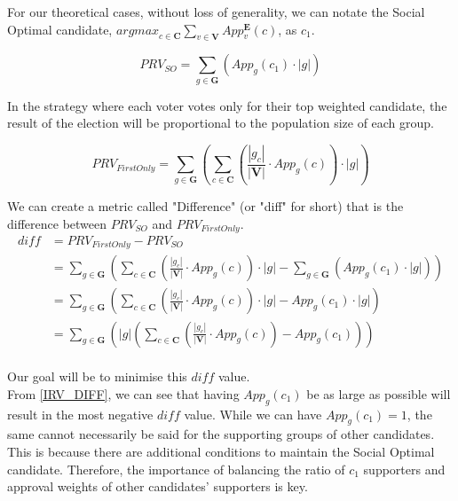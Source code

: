 \documentclass{article}
\begin{document}
For our theoretical cases, without loss of generality, we can notate the Social Optimal candidate, ${argmax}_{c \in \boldsymbol{C}} \sum^{}_{v \in \boldsymbol{V}}{App^{\boldsymbol{E}}_{v}(c)}$, as $c_1$.

\begin{equation}
     PRV_{SO} = \sum^{}_{g \in \boldsymbol{G}}{\left(App_g(c_1)\cdot|g|\right)} 
\end{equation}

In the strategy where each voter votes only for their top weighted candidate, the result of the election will be proportional to the population size of each group.

\begin{equation}
     PRV_{FirstOnly} = \sum^{}_{g \in \boldsymbol{G}}{\left(\sum^{}_{c \in \boldsymbol{C}}{\left(\frac{|g_c|}{|\boldsymbol{V}|} \cdot App_g(c)\right)} \cdot |g|\right)} 
\end{equation} 

We can create a metric called "Difference" (or "diff" for short) that is the difference between $PRV_{SO}$ and $PRV_{FirstOnly}$.
\begin{equation}\label{DIFF_EQN_0}
\begin{aligned}
{diff} &= PRV_{FirstOnly} - PRV_{SO}\\
&= \sum^{}_{g \in \boldsymbol{G}}{\left(\sum^{}_{c \in \boldsymbol{C}}{\left(\frac{|g_c|}{|\boldsymbol{V}|} \cdot App_g(c)\right)} \cdot |g| - \sum^{}_{g \in \boldsymbol{G}}{\left(App_g(c_1)\cdot|g|\right)}\right)}\\
&= \sum^{}_{g \in \boldsymbol{G}}{\left(\sum^{}_{c \in \boldsymbol{C}}{\left(\frac{|g_c|}{|\boldsymbol{V}|} \cdot App_g(c)\right)} \cdot |g| - App_g(c_1)\cdot|g|\right)}\\
&= \sum^{}_{g \in \boldsymbol{G}}{\left(|g|\left(\sum^{}_{c \in \boldsymbol{C}}{\left(\frac{|g_c|}{|\boldsymbol{V}|} \cdot App_g(c)\right)} - App_g(c_1)\right)\right)}
\end{aligned}
\end{equation}\\

Our goal will be to minimise this $diff$ value.\\

From \eqref{IRV_DIFF}, we can see that having ${App}_{g}(c_1)$ be as large as possible will result in the most negative $diff$ value. While we can have ${App}_{g}(c_1) = 1$, the same cannot necessarily be said for the supporting groups of other candidates. This is because there are additional conditions to maintain the Social Optimal candidate. Therefore, the importance of balancing the ratio of $c_1$ supporters and approval weights of other candidates' supporters is key. 
\end{document}
